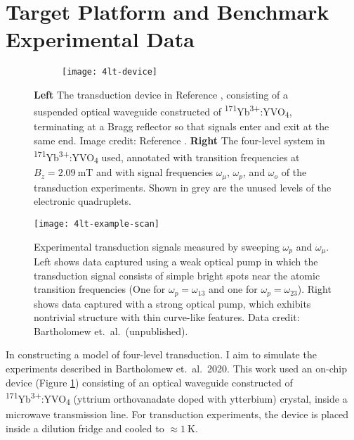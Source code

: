 \section{Target Platform and Benchmark Experimental Data}
\begin{figure}[h!]
\centering
\begin{subfigure}{0.44\textwidth}
    \centering
    \texttt{[image: 4lt-device]}
\end{subfigure}
\begin{subfigure}{0.55\textwidth}
    \centering
\end{subfigure}
\caption{\label{fig:4lt_device} \textbf{Left} The transduction device in Reference \cite{bartholomew_chip_2020}, consisting of a suspended optical waveguide constructed of \textsuperscript{171}Yb\textsuperscript{3+}:YVO\textsubscript{4}, terminating at a Bragg reflector so that signals enter and exit at the same end. Image credit: Reference \cite{bartholomew_chip_2020}. \textbf{Right} The four-level system in \textsuperscript{171}Yb\textsuperscript{3+}:YVO\textsubscript{4} used, annotated with transition frequencies at $B_z = \qty{2.09}{\milli\tesla}$ and with signal frequencies $\omega_\mu$, $\omega_p$, and $\omega_o$ of the transduction experiments. Shown in grey are the unused levels of the electronic quadruplets.}
\end{figure}

\begin{figure}[h!]
\centering
\texttt{[image: 4lt-example-scan]}
\caption{\label{fig:four_level_transduction_experimental_data} Experimental transduction signals measured by sweeping $\omega_p$ and $\omega_\mu$. Left shows data captured using a weak optical pump in which the transduction signal consists of simple bright spots near the atomic transition frequencies (One for $\omega_p = \omega_{13}$ and one for $\omega_p = \omega_{23}$). Right shows data captured with a strong optical pump, which exhibits nontrivial structure with thin curve-like features. Data credit: Bartholomew et.\ al.\ (unpublished).}
\end{figure}

In constructing a model of four-level transduction. I aim to simulate the experiments described in Bartholomew et.\ al.\ 2020\cite{bartholomew_chip_2020}. This work used an on-chip device (Figure \ref{fig:4lt_device}) consisting of an optical waveguide constructed of \textsuperscript{171}Yb\textsuperscript{3+}:YVO\textsubscript{4} (yttrium orthovanadate doped with ytterbium) crystal, inside a microwave transmission line. For transduction experiments, the device is placed inside a dilution fridge and cooled to $\approx\qty{1}{\kelvin}$.

